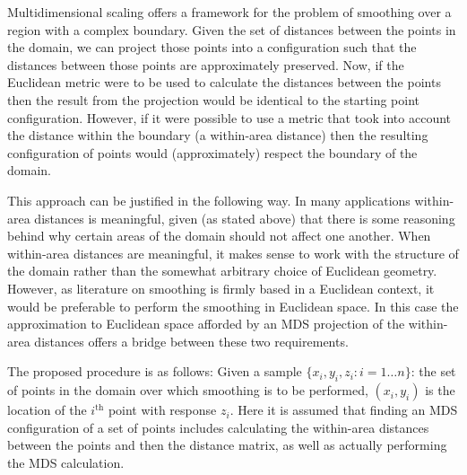 \documentclass[a4paper,10pt]{article}
\begin{document}
Multidimensional scaling offers a framework for the problem of smoothing over a region with a complex boundary. Given the set of distances between the points in the domain, we can project those points into a configuration such that the distances between those points are approximately preserved. Now, if the Euclidean metric were to be used to calculate the distances between the points then the result from the projection would be identical to the starting point configuration. However, if it were possible to use a metric that took into account the distance within the boundary (a within-area distance) then the resulting configuration of points would (approximately) respect the boundary of the domain.

This approach can be justified in the following way. In many applications within-area distances is meaningful, given (as stated above) that there is some reasoning behind why certain areas of the domain should not affect one another. When within-area distances are meaningful, it makes sense to work with the structure of the domain rather than the somewhat arbitrary choice of Euclidean geometry. However, as literature on smoothing is firmly based in a Euclidean context, it would be preferable to perform the smoothing in Euclidean space. In this case the approximation to Euclidean space afforded by an MDS projection of the within-area distances offers a bridge between these two requirements.

The proposed procedure is as follows: Given a sample $\{x_i, y_i, z_i : i=1\dots n\}$: the set of points in the domain over which smoothing is to be performed, $(x_i, y_i)$ is the location of the $i^\text{th}$ point with response $z_i$. Here it is assumed that finding an MDS configuration of a set of points includes calculating the within-area distances between the points and then the distance matrix, as well as actually performing the MDS calculation.
\end{document}
